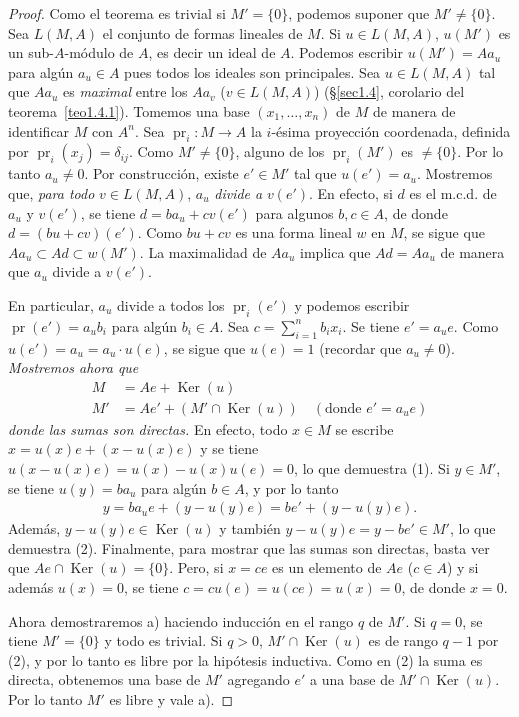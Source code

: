 \documentclass[10pt,oneside,bibtotoc,smallheadings,leqno,a5paper,DIV=12]{scrbook}
\renewcommand{\to}[1][]{\xrightarrow{#1}}
\DeclareMathOperator{\Ker}{Ker}
\DeclareMathOperator{\pr}{pr}
\numberwithin{equation}{section}
\theoremstyle{defi}
\theoremstyle{enonce}
\theoremstyle{rem}
\numberwithin{theorem}{section}
\numberwithin{proposition}{section}
\numberwithin{definition}{section}
\numberwithin{lemma}{section}
\numberwithin{corollary}{section}
\numberwithin{example}{section}
\numberwithin{footnote}{section}%
\begin{document}
\begin{proof}
Como el teorema es trivial si $M' = \{0\}$, podemos suponer que $M' \neq \{0\}$.
Sea $L(M,A)$ el conjunto de formas lineales de $M$. Si $u\in L(M,A)$, $u(M')$
es un sub-$A$-m\'odulo de $A$, es decir un ideal de $A$. Podemos escribir $u(M') = Aa_{u}$
para alg\'un $a_{u}\in A$ pues todos los ideales son principales. Sea $u\in L(M,A)$
tal que $Aa_{u}$ es {\em maximal} entre los $Aa_{v}$ ($v\in L(M,A)$) (\S\ref{sec1.4},
corolario del teorema~\ref{teo1.4.1}).
Tomemos una base $(x_{1},\dots,x_{n})$ de $M$ de manera de identificar
$M$ con $A^{n}$. Sea $\pr_{i}:M\to A$ la $i$-\'esima proyecci\'on coordenada, definida
por $\pr_{i}(x_{j}) = \delta_{ij}$. Como $M'\neq\{0\}$, alguno de los $\pr_{i}(M')$ es
$\neq\{0\}$. Por lo tanto $a_{u}\neq 0$. Por construcci\'on, existe $e'\in M'$ tal que
$u(e') = a_{u}$. Mostremos que, {\em para todo} $v\in L(M,A)$, $a_{u}$ {\em divide a} $v(e')$.
En efecto, si $d$ es el m.c.d. de $a_{u}$ y $v(e')$, se tiene $d = ba_{u}+cv(e')$ para
algunos $b,c\in A$, de donde $d = (bu+cv)(e')$. Como $bu+cv$ es una forma lineal $w$ en $M$,
se sigue que $Aa_{u}\subset Ad\subset w(M')$. La maximalidad de $Aa_{u}$ implica que
$Ad = Aa_{u}$ de manera que $a_{u}$ divide a $v(e')$.

En particular, $a_{u}$ divide a todos los $\pr_{i}(e')$ y podemos escribir $\pr(e') = a_{u}b_{i}$
para alg\'un
$b_{i}\in A$. Sea $c = \sum_{i=1}^{n}b_{i}x_{i}$. Se tiene $e' = a_{u}e$. Como
$u(e') = a_{u} = a_{u}\cdot u(e)$, se sigue que $u(e) = 1$ (recordar que $a_{u}\neq 0$).
{\itshape Mostremos ahora que
\begin{align}
M &= Ae+\Ker(u)\\
M' &= Ae'+(M'\cap \Ker(u))\quad(\text{donde $e' = a_{u}e$})
\end{align}
donde las sumas son directas.} En efecto, todo $x\in M$ se escribe $x = u(x)e+(x-u(x)e)$
y se tiene $u(x-u(x)e) = u(x) - u(x)u(e) = 0$, lo que demuestra (1). Si $y\in M'$, se
tiene $u(y) = ba_{u}$ para alg\'un $b\in A$, y por lo tanto
\begin{gather*}
y = ba_{u}e + (y-u(y)e) = be'+(y-u(y)e).
\end{gather*}
Adem\'as, $y-u(y)e\in\Ker(u)$ y tambi\'en $y-u(y)e = y-be'\in M'$, lo que demuestra (2).
Finalmente, para mostrar que las sumas son directas, basta ver que $Ae\cap\Ker(u) = \{0\}$.
Pero, si $x = ce$ es un elemento de $Ae$ ($c\in A$) y si adem\'as $u(x) = 0$, se tiene $c = cu(e) = u(ce)
= u(x) = 0$, de donde $x = 0$.

Ahora demostraremos a) haciendo inducci\'on en el rango $q$ de $M'$. Si $q = 0$, se tiene
$M' = \{0\}$ y todo es trivial. Si $q > 0$, $M'\cap\Ker(u)$ es de rango $q-1$ por (2), y por lo
tanto es libre por la hip\'otesis inductiva. Como en (2) la suma es directa, obtenemos una
base de $M'$ agregando $e'$ a una base de $M'\cap\Ker(u)$. Por lo tanto $M'$ es libre y vale a).


\end{proof}
\end{document}
